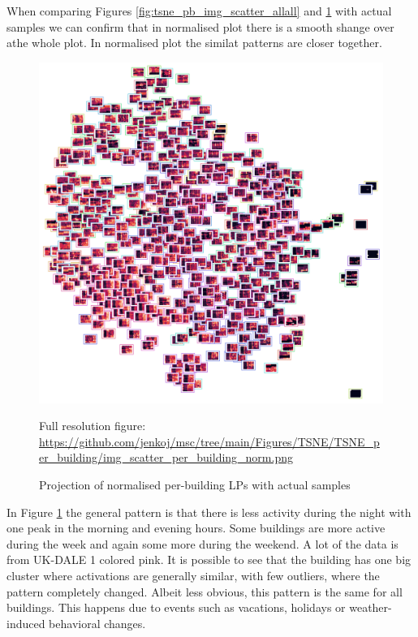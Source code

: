 When comparing Figures \ref{fig:tsne_pb_img_scatter_allall} and \ref{fig:tsne_pb_img_norm_scatter_allall} with actual samples we can confirm that in normalised plot there is a smooth shange over athe whole plot.
In normalised plot the similat patterns are closer together. 



\begin{figure}[H]
	\centering
	\caption{Projection of normalised per-building LPs with actual samples}
	\includegraphics[width=.9\textwidth]{Figures/TSNE/TSNE_per_building/img_scatter_per_building_norm.png}
	\label{fig:tsne_pb_img_norm_scatter_allall}
	\par
	\par\footnotesize{Full resolution figure: \url{https://github.com/jenkoj/msc/tree/main/Figures/TSNE/TSNE_per_building/img_scatter_per_building_norm.png}}
\end{figure}

In Figure \ref{fig:tsne_pb_img_norm_scatter_allall} the general pattern is that there is less activity during the night with one peak in the morning and evening hours.
Some buildings are more active during the week and again some more during the weekend.
A lot of the data is from UK-DALE 1 colored pink. 
It is possible to see that the building has one big cluster where activations are generally similar, with few outliers, where the pattern completely changed. 
Albeit less obvious, this pattern is the same for all buildings.
This happens due to events such as vacations, holidays or weather-induced behavioral changes.

